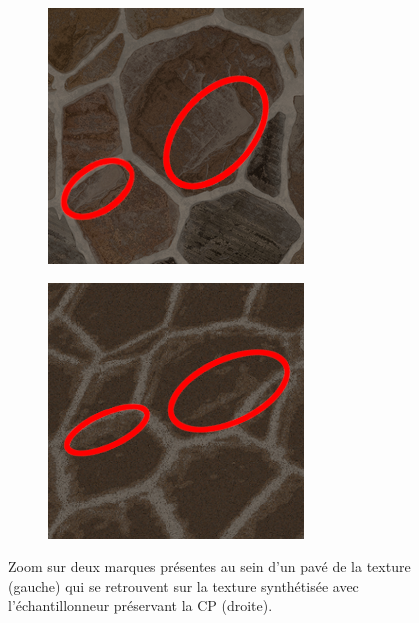\begin{figure}
    \centering
    \begin{subfigure}{.45\textwidth}
        \centering
        \includegraphics[width=\textwidth]{contenu/resources/images/marks}
    \end{subfigure}
    \hfill
    \begin{subfigure}{.45\textwidth}
        \centering
        \includegraphics[width=\textwidth]{contenu/resources/images/mark_preserved}
    \end{subfigure}

    \caption[L'échantillonneur préserve partiellement les marques dans les pavés]{Zoom sur deux marques présentes au sein d'un pavé de la texture (gauche) qui se retrouvent sur la texture synthétisée avec l'échantillonneur préservant la CP (droite).}
    \label{fig:mark-preserved}
\end{figure}

